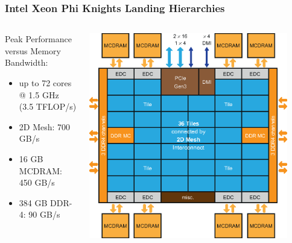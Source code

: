 \documentclass{beamer}
\begin{document}
  \begin{frame}
    \frametitle{Intel Xeon Phi Knights Landing Hierarchies}

    \begin{columns}[T]
      \begin{column}{.5\textwidth}
        \vspace{3mm}
        {
          \center Peak Performance versus
          Memory Bandwidth:
        }
        \vspace{3mm}
        \begin{itemize}
          \item up to 72 cores @ 1.5 GHz\\ (3.5 TFLOP/s)
          \item 2D Mesh: 700 GB/s
          \item 16 GB MCDRAM: 450 GB/s
          \item 384 GB DDR-4: 90 GB/s
        \end{itemize}
      \end{column}
      \begin{column}{.5\textwidth}
        \begin{center}
          \includegraphics[width=0.9\textwidth]{knl.eps}
        \end{center}
      \end{column}
    \end{columns}

  \end{frame}
\end{document}
